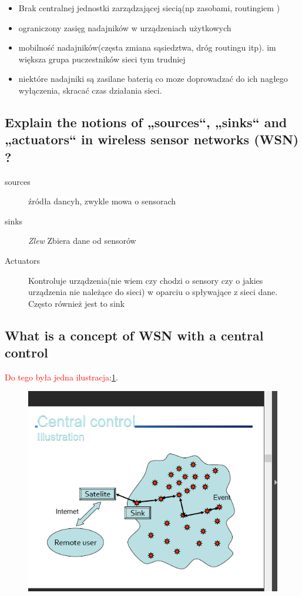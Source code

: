 \begin{itemize}
\item Brak centralnej jednostki zarządzającej siecią(np zasobami, routingiem )
\item ograniczony zasięg nadajników w urządzeniach użytkowych
\item mobilność nadajników(częsta zmiana sąsiedztwa, dróg routingu itp). im większa grupa puczestników sieci tym trudniej
\item niektóre nadajniki są zasilane baterią co moze doprowadzać do ich nagłego wyłączenia, skracać czas działania sieci.
\end{itemize}
\subsection{Explain the notions of „sources“, „sinks“ and „actuators“ in wireless sensor networks (WSN) ?}

\begin{description}
\item[sources] źródła dancyh, zwykle mowa o sensorach
\item[sinks]\textit{Zlew} Zbiera dane od sensorów
\item[Actuators]Kontroluje urządzenia(nie wiem czy chodzi o sensory czy o jakies urządzenia nie należące do sieci) w oparciu o spływające z sieci dane. Często również jest to sink
\end{description}

\subsection{What is a concept of WSN with a central control}
\textcolor{red}{Do tego była jedna ilustracja}:\ref{zdj:centralControl}.
\begin{figure}

\caption{}
\label{zdj:centralControl}
\centering
\includegraphics[width=\textwidth]{zdjecia/centralControl}
\end{figure}


